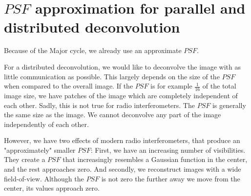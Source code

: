 \section{$PSF$ approximation for parallel and distributed deconvolution} \label{gradients}
Because of the Major cycle, we already use an approximate $PSF$.


For a distributed deconvolution, we would like to deconvolve the image with as little communication as possible. This largely depends on the size of the $PSF$ when compared to the overall image. If the $PSF$ is for example $\frac{1}{16}$ of the total image size, we have patches of the image which are completely independent of each other. Sadly, this is not true for radio interferometers. The $PSF$ is generally the same size as the image. We cannot deconvolve any part of the image independently of each other.

However, we have two effects of modern radio interferometers, that produce an "approximately" smaller $PSF$: First, we have an increasing number of visibilities. They create a $PSF$ that increasingly resembles a Gaussian function in the center, and the rest approaches zero. And secondly, we reconstruct images with a wide field-of-view. Although the $PSF$ is not zero the further away we move from the center, its values approach zero.

